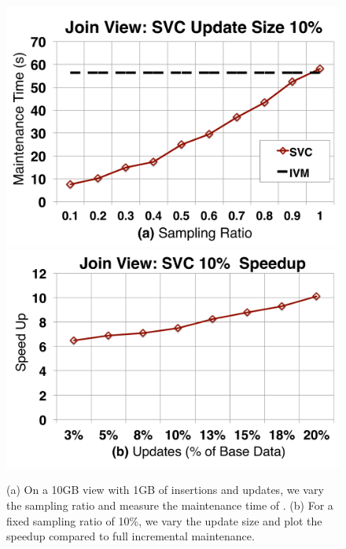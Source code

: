 \begin{figure}[t]\vspace{-2.5em}
\centering
\includegraphics[scale=0.14]{exp/msj_1.pdf}
\includegraphics[scale=0.14]{exp/msj_2.pdf}\vspace{-1em}
 \caption{(a) On a 10GB view with 1GB of insertions and updates, we vary the sampling ratio and measure the maintenance time of \svc. (b) For a fixed sampling ratio of 10\%, we vary the update size and plot the speedup compared to full incremental maintenance. \vspace{-.5em}\label{exp-1-samplesize}}\vspace{-1.0em}
\end{figure}

